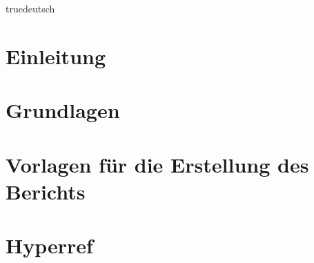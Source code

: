 \documentclass[a4paper,fleqn,german]{book}
\begin{document}

\zusammenfassung%
{truedeutsch} %
{} %
{} %






\mainmatter%
\pagestyle{fancy}%


\chapter{Einleitung}%
%
%
\chapter{Grundlagen}%
%
%
\chapter{Vorlagen für die Erstellung des Berichts}%
%
%
\chapter{Hyperref} \label{refHyperref}%
%
%
\end{document}
